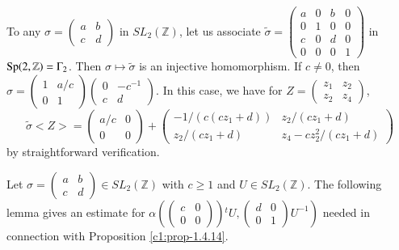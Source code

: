 \begin{remarks*}
\begin{enumerate}
To any $\sigma=\left(\begin{smallmatrix} a & b\\ c & d
\end{smallmatrix}\right)$ in $SL_{2}(\mathbb{Z})$, let us associate
$\tilde{\sigma}=\left(\begin{smallmatrix} a & 0 & b & 0\\
0 & 1 & 0 & 0\\ c & 0 & d & 0\\ 0 & 0 & 0 & 1
\end{smallmatrix}\right)$ in\pageoriginale
$\operatorname{Sp}(2,\mathbb{Z})=\Gamma_{2}$.
Then $\sigma\mapsto \tilde{\sigma}$ is an injective
homomorphism. If $c\neq 0$, then $\sigma=\left(\begin{smallmatrix}  1
  & a/c \\ 0 & 1\end{smallmatrix}\right)\left(\begin{smallmatrix} 0 &
    -c^{-1}\\ c & d  \end{smallmatrix}\right)$. In this case, we have
  for $Z=\left(\begin{smallmatrix} z_{1} & z_{2}\\ z_{2} & z_{4}
  \end{smallmatrix}\right)$,
\begin{equation*}
\tilde{\sigma}<Z>=
\begin{pmatrix}
a/c & 0\\
0 & 0
\end{pmatrix}+
\begin{pmatrix}
-1/(c(cz_{1}+d)) & z_{2}/(cz_{1}+d)\\
z_{2}/(cz_{1}+d) & z_{4}-cz^{2}_{2}/(cz_{1}+d)
\end{pmatrix}\tag{46}\label{c1:eq46}
\end{equation*}
by straightforward verification.
\end{enumerate}
\end{remarks*}

Let $\sigma=\left(\begin{smallmatrix} a & b\\ c & d
\end{smallmatrix}\right)\in SL_{2}(\mathbb{Z})$ with $c\geq 1$ and
$U\in SL_{2}(\mathbb{Z})$. The following lemma gives an estimate for
$\alpha\left(\left(\begin{smallmatrix} c & 0\\ 0 & 0
\end{smallmatrix}\right)\right){}^{t}U,\left.\left(\begin{smallmatrix} d &
  0\\ 0 & 1
\end{smallmatrix}\right)U^{-1}\right)$ needed in connection with
Proposition \ref{c1:prop-1.4.14}.

